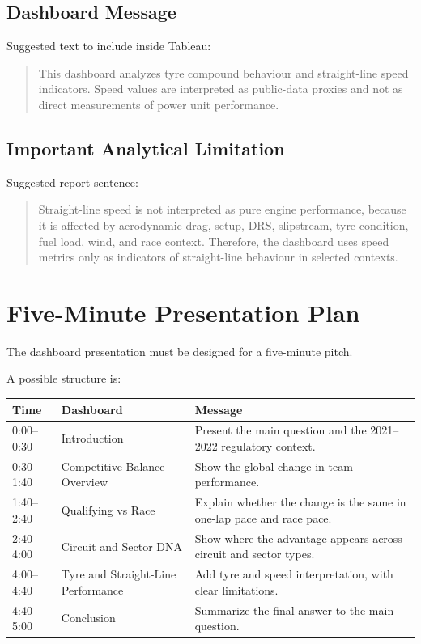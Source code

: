 \documentclass[12pt,a4paper]{article}
\begin{document}
	\subsection{Dashboard Message}
	
	Suggested text to include inside Tableau:
	
	\begin{quote}
		This dashboard analyzes tyre compound behaviour and straight-line speed indicators. Speed values are interpreted as public-data proxies and not as direct measurements of power unit performance.
	\end{quote}
	
	\subsection{Important Analytical Limitation}
	
	Suggested report sentence:
	
	\begin{quote}
		Straight-line speed is not interpreted as pure engine performance, because it is affected by aerodynamic drag, setup, DRS, slipstream, tyre condition, fuel load, wind, and race context. Therefore, the dashboard uses speed metrics only as indicators of straight-line behaviour in selected contexts.
	\end{quote}
	
	\section{Five-Minute Presentation Plan}
	
	The dashboard presentation must be designed for a five-minute pitch.
	
	A possible structure is:
	
	\begin{longtable}{p{3cm} p{5cm} p{6cm}}
		\toprule
		\textbf{Time} & \textbf{Dashboard} & \textbf{Message} \\
		\midrule
		0:00--0:30 & Introduction & Present the main question and the 2021--2022 regulatory context. \\
		0:30--1:40 & Competitive Balance Overview & Show the global change in team performance. \\
		1:40--2:40 & Qualifying vs Race & Explain whether the change is the same in one-lap pace and race pace. \\
		2:40--4:00 & Circuit and Sector DNA & Show where the advantage appears across circuit and sector types. \\
		4:00--4:40 & Tyre and Straight-Line Performance & Add tyre and speed interpretation, with clear limitations. \\
		4:40--5:00 & Conclusion & Summarize the final answer to the main question. \\
		\bottomrule
	\end{longtable}
	
\end{document}
